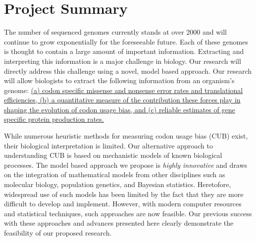 \documentclass[11pt,fleqn]{article}
\begin{document}
\section*{Project Summary}
The number of  sequenced genomes currently stands at over 2000 and will continue to grow exponentially for the foreseeable future.
Each of these genomes is thought to contain a large amount of important information.
Extracting and interpreting this information is a major challenge in biology.
Our research will directly address this challenge using a novel, model based approach. 
Our research will allow biologists to extract the following information from an organism's genome: \ul{(a) codon specific missense and nonsense error rates and translational efficiencies, (b) a quantitative measure of the contribution these forces play in shaping the evolution of codon usage bias, and (c) reliable estimates of gene specific protein production rates.} %

While numerous heuristic methods for measuring codon usage bias (CUB) exist, their biological interpretation is limited.
Our alternative approach to understanding CUB is based on mechanistic models of known biological processes. %
The model based approach we propose is \emph{highly innovative} and draws on the integration of  mathematical models from other disciplines such as molecular biology, population genetics, and Bayesian statistics.
Heretofore, widespread use of such models has been limited by the fact that they are more difficult to develop and implement.
However, with modern computer resources and statistical techniques, such approaches are now feasible.
Our previous success with these approaches and advances presented here clearly demonstrate the feasibility of our proposed research.
\end{document}
